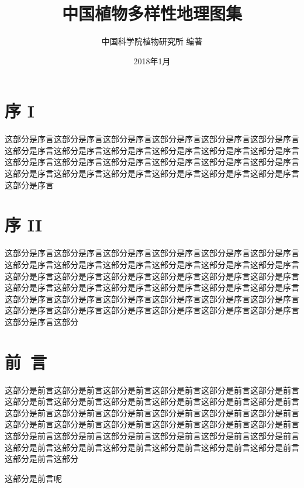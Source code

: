 \documentclass[utf8]{book}
\begin{document}

\title{中国植物多样性地理图集}

\author{中国科学院植物研究所 编著}

\date{2018年1月}


\frontmatter

\maketitle


\chapter{序 I}


这部分是序言这部分是序言这部分是序言这部分是序言这部分是序言这部分是序言这部分是序言这部分是序言这部分是序言这部分是序言这部分是序言这部分是序言这部分是序言这部分是序言这部分是序言这部分是序言这部分是序言这部分是序言这部分是序言这部分是序言这部分是序言这部分是序言这部分是序言这部分是序言这部分是序言


\chapter{序 II}


这部分是序言这部分是序言这部分是序言这部分是序言这部分是序言这部分是序言这部分是序言这部分是序言这部分是序言这部分是序言这部分是序言这部分是序言这部分是序言这部分是序言这部分是序言这部分是序言这部分是序言这部分是序言这部分是序言这部分是序言这部分是序言这部分是序言这部分是序言这部分是序言这部分是序言这部分是序言这部分是序言这部分是序言这部分是序言这部分是序言这部分是序言这部分是序言这部分是序言这部分是序言这部分是序言这部分是序言这部分是序言这部分


\chapter{前~言}


这部分是前言这部分是前言这部分是前言这部分是前言这部分是前言这部分是前言这部分是前言这部分是前言这部分是前言这部分是前言这部分是前言这部分是前言这部分是前言这部分是前言这部分是前言这部分是前言这部分是前言这部分是前言这部分是前言这部分是前言这部分是前言这部分是前言这部分是前言这部分是前言这部分是前言这部分是前言这部分是前言这部分是前言这部分是前言这部分是前言这部分是前言这部分是前言这部分是前言这部分是前言这部分是前言这部分是前言这部分是前言这部分


这部分是前言呢
\end{document}

